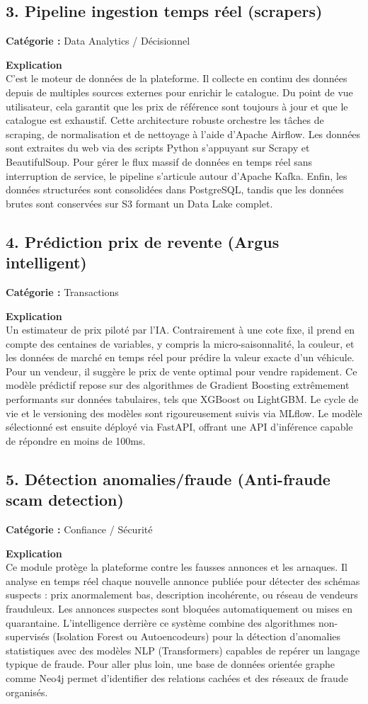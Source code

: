 \documentclass[11pt,a4paper]{article}
\begin{document}
\subsection{3. Pipeline ingestion temps réel (scrapers)}
\textbf{Catégorie :} Data Analytics / Décisionnel

\textbf{Explication}\\
C'est le moteur de données de la plateforme. Il collecte en continu des données depuis de multiples sources externes pour enrichir le catalogue. Du point de vue utilisateur, cela garantit que les prix de référence sont toujours à jour et que le catalogue est exhaustif. Cette architecture robuste orchestre les tâches de scraping, de normalisation et de nettoyage à l'aide d'Apache Airflow. Les données sont extraites du web via des scripts Python s'appuyant sur Scrapy et BeautifulSoup. Pour gérer le flux massif de données en temps réel sans interruption de service, le pipeline s'articule autour d'Apache Kafka. Enfin, les données structurées sont consolidées dans PostgreSQL, tandis que les données brutes sont conservées sur S3 formant un Data Lake complet.

\subsection{4. Prédiction prix de revente (Argus intelligent)}
\textbf{Catégorie :} Transactions

\textbf{Explication}\\
Un estimateur de prix piloté par l'IA. Contrairement à une cote fixe, il prend en compte des centaines de variables, y compris la micro-saisonnalité, la couleur, et les données de marché en temps réel pour prédire la valeur exacte d'un véhicule. Pour un vendeur, il suggère le prix de vente optimal pour vendre rapidement. Ce modèle prédictif repose sur des algorithmes de Gradient Boosting extrêmement performants sur données tabulaires, tels que XGBoost ou LightGBM. Le cycle de vie et le versioning des modèles sont rigoureusement suivis via MLflow. Le modèle sélectionné est ensuite déployé via FastAPI, offrant une API d'inférence capable de répondre en moins de 100ms.

\subsection{5. Détection anomalies/fraude (Anti-fraude scam detection)}
\textbf{Catégorie :} Confiance / Sécurité

\textbf{Explication}\\
Ce module protège la plateforme contre les fausses annonces et les arnaques. Il analyse en temps réel chaque nouvelle annonce publiée pour détecter des schémas suspects : prix anormalement bas, description incohérente, ou réseau de vendeurs frauduleux. Les annonces suspectes sont bloquées automatiquement ou mises en quarantaine. L'intelligence derrière ce système combine des algorithmes non-supervisés (Isolation Forest ou Autoencodeurs) pour la détection d'anomalies statistiques avec des modèles NLP (Transformers) capables de repérer un langage typique de fraude. Pour aller plus loin, une base de données orientée graphe comme Neo4j permet d'identifier des relations cachées et des réseaux de fraude organisés.
\end{document}
